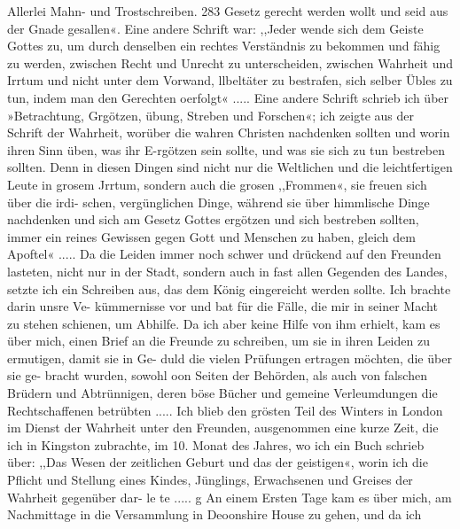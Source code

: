 Allerlei Mahn- und Trostschreiben. 283
Gesetz gerecht werden wollt und seid aus der Gnade gesallen«.
Eine andere Schrift war: ,,Jeder wende sich dem Geiste Gottes
zu, um durch denselben ein rechtes Verständnis zu bekommen und
fähig zu werden, zwischen Recht und Unrecht zu unterscheiden,
zwischen Wahrheit und Irrtum und nicht unter dem Vorwand,
llbeltäter zu bestrafen, sich selber Übles zu tun, indem man den
Gerechten oerfolgt« .....
Eine andere Schrift schrieb ich über »Betrachtung, Grgötzen,
übung, Streben und Forschen«; ich zeigte aus der Schrift der
Wahrheit, worüber die wahren Christen nachdenken sollten und
worin ihren Sinn üben, was ihr E-rgötzen sein sollte, und was sie sich
zu tun bestreben sollten. Denn in diesen Dingen sind nicht nur
die Weltlichen und die leichtfertigen Leute in grosem Jrrtum,
sondern auch die grosen ,,Frommen«, sie freuen sich über die irdi-
schen, vergünglichen Dinge, während sie über himmlische Dinge
nachdenken und sich am Gesetz Gottes ergötzen und sich bestreben
sollten, immer ein reines Gewissen gegen Gott und Menschen zu
haben, gleich dem Apoftel« .....
Da die Leiden immer noch schwer und drückend auf den
Freunden lasteten, nicht nur in der Stadt, sondern auch in fast
allen Gegenden des Landes, setzte ich ein Schreiben aus, das dem
König eingereicht werden sollte. Ich brachte darin unsre Ve-
kümmernisse vor und bat für die Fälle, die mir in seiner Macht
zu stehen schienen, um Abhilfe. Da ich aber keine Hilfe von
ihm erhielt, kam es über mich, einen Brief an die Freunde zu
schreiben, um sie in ihren Leiden zu ermutigen, damit sie in Ge-
duld die vielen Prüfungen ertragen möchten, die über sie ge-
bracht wurden, sowohl oon Seiten der Behörden, als auch von
falschen Brüdern und Abtrünnigen, deren böse Bücher und gemeine
Verleumdungen die Rechtschaffenen betrübten .....
Ich blieb den grösten Teil des Winters in London im Dienst
der Wahrheit unter den Freunden, ausgenommen eine kurze Zeit,
die ich in Kingston zubrachte, im 10. Monat des Jahres, wo ich
ein Buch schrieb über: ,,Das Wesen der zeitlichen Geburt und
das der geistigen«, worin ich die Pflicht und Stellung eines Kindes,
Jünglings, Erwachsenen und Greises der Wahrheit gegenüber dar-
le te .....
g An einem Ersten Tage kam es über mich, am Nachmittage
in die Versammlung in Deoonshire House zu gehen, und da ich


